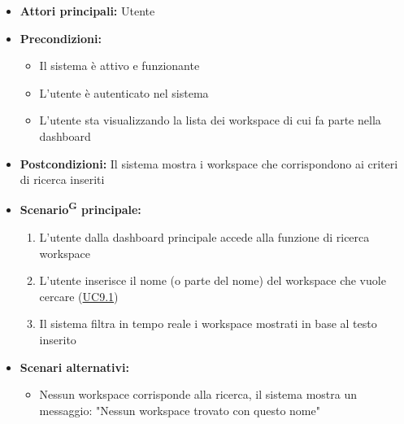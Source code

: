 \documentclass[a4paper, 11pt]{article}
\begin{document}
\begin{itemize}
	\item \textbf{Attori principali:} Utente
	\item \textbf{Precondizioni:} 
	\begin{itemize}
		\item Il sistema è attivo e funzionante
		\item L'utente è autenticato nel sistema
        \item L'utente sta visualizzando la lista dei workspace di cui fa parte nella dashboard
	\end{itemize}
    \item \textbf{Postcondizioni:} Il sistema mostra i workspace che corrispondono ai criteri di ricerca inseriti
	\item \textbf{Scenario\textsuperscript{G} principale:}
    \begin{enumerate}
        \item L'utente dalla dashboard principale accede alla funzione di ricerca workspace
        \item L'utente inserisce il nome (o parte del nome) del workspace che vuole cercare (\hyperref[UC9.1]{UC9.1})
        \item Il sistema filtra in tempo reale i workspace mostrati in base al testo inserito
    \end{enumerate}
    \item \textbf{Scenari alternativi:}
    \begin{itemize}
		\item Nessun workspace corrisponde alla ricerca, il sistema mostra un messaggio: "Nessun workspace trovato con questo nome"
	\end{itemize}
\end{itemize}
\end{document}
